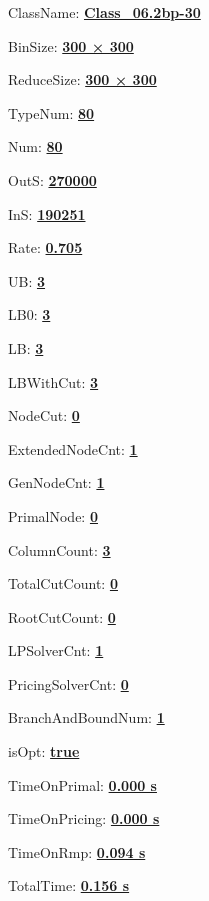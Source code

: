 \documentclass[11pt]{article}
\begin{document}
\pagestyle{empty}


ClassName: \underline{\textbf{Class_06.2bp-30}}
\par
BinSize: \underline{\textbf{300 × 300}}
\par
ReduceSize: \underline{\textbf{300 × 300}}
\par
TypeNum: \underline{\textbf{80}}
\par
Num: \underline{\textbf{80}}
\par
OutS: \underline{\textbf{270000}}
\par
InS: \underline{\textbf{190251}}
\par
Rate: \underline{\textbf{0.705}}
\par
UB: \underline{\textbf{3}}
\par
LB0: \underline{\textbf{3}}
\par
LB: \underline{\textbf{3}}
\par
LBWithCut: \underline{\textbf{3}}
\par
NodeCut: \underline{\textbf{0}}
\par
ExtendedNodeCnt: \underline{\textbf{1}}
\par
GenNodeCnt: \underline{\textbf{1}}
\par
PrimalNode: \underline{\textbf{0}}
\par
ColumnCount: \underline{\textbf{3}}
\par
TotalCutCount: \underline{\textbf{0}}
\par
RootCutCount: \underline{\textbf{0}}
\par
LPSolverCnt: \underline{\textbf{1}}
\par
PricingSolverCnt: \underline{\textbf{0}}
\par
BranchAndBoundNum: \underline{\textbf{1}}
\par
isOpt: \underline{\textbf{true}}
\par
TimeOnPrimal: \underline{\textbf{0.000 s}}
\par
TimeOnPricing: \underline{\textbf{0.000 s}}
\par
TimeOnRmp: \underline{\textbf{0.094 s}}
\par
TotalTime: \underline{\textbf{0.156 s}}
\par
\newpage
\end{document}
